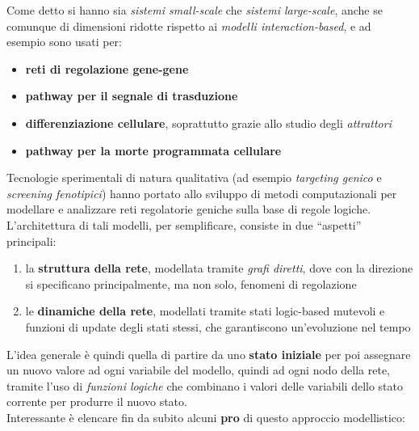 \documentclass[a4paper,12pt, oneside]{book}
\begin{document}
Come detto si hanno sia \textit{sistemi small-scale} che \textit{sistemi
  large-scale}, anche se comunque di dimensioni ridotte rispetto ai
\textit{modelli interaction-based}, e ad esempio sono usati per:
\begin{itemize}
  \item \textbf{reti di regolazione gene-gene}
  \item \textbf{pathway per il segnale di trasduzione}
  \item \textbf{differenziazione cellulare}, soprattutto grazie allo studio
  degli \textit{attrattori}
  \item \textbf{pathway per la morte programmata cellulare}
\end{itemize}
Tecnologie sperimentali di natura qualitativa (ad esempio \textit{targeting
  genico} e \textit{screening fenotipici}) hanno portato allo sviluppo di metodi
computazionali per modellare e analizzare reti regolatorie geniche sulla base di
regole logiche. L'architettura di tali modelli, per semplificare, consiste in
due ``aspetti'' principali:
\begin{enumerate}
  \item la \textbf{struttura della rete}, modellata tramite \textit{grafi
    diretti}, dove con la direzione si specificano principalmente, ma non solo,
  fenomeni di regolazione
  \item le \textbf{dinamiche della rete}, modellati tramite stati logic-based
  mutevoli e funzioni di update degli stati stessi, che garantiscono
  un'evoluzione nel tempo
\end{enumerate}
L'idea generale è quindi quella di partire da uno \textbf{stato iniziale} per
poi assegnare un nuovo valore ad ogni variabile del modello, quindi ad ogni nodo
della rete, tramite l'uso di \textit{funzioni logiche} che combinano i valori
delle variabili dello stato corrente per produrre il nuovo stato.\\
Interessante è elencare fin da subito alcuni \textbf{pro} di questo approccio
modellistico:
\end{document}
